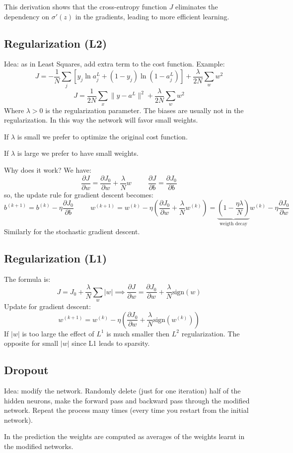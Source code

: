 This derivation shows that the cross-entropy function \( J \) eliminates the dependency on \(\sigma'(z)\) in the gradients, leading to more efficient learning.

\subsection*{Regularization (L2)}
Idea: as in Least Squares, add extra term to the cost function. Example:
\[
    J = -\dfrac{1}{N} \sum_j \left[y_j\ln a_j^L + (1-y_j)\ln(1-a_j^L)\right] + \dfrac{\lambda}{2N}\sum_w w^2    
\]
\[
    J = \dfrac{1}{2N} \sum_x \|y-a^L\|^2 + \dfrac{\lambda}{2N}\sum_w w^2    
\]
Where $\lambda > 0$ is the regularization parameter. The biases are usually not in the regularization. In this way the network will favor small weights. 

If $\lambda$ is small we prefer to optimize the original cost function.

If $\lambda$ is large we prefer to have small weights.

Why does it work? We have:
\[
    \dfrac{\partial J}{\partial w} = \dfrac{\partial J_0}{\partial w} + \dfrac{\lambda}{N} w \hspace{1cm} \dfrac{\partial J}{\partial b} = \dfrac{\partial J_0}{\partial b}    
\]
so, the update rule for gradient descent becomes:
\[
    b^{(k+1)} = b^{(k)} - \eta \dfrac{\partial J_0}{\partial b} \hspace{1cm} w^{(k+1)} = w^{(k)} - \eta \left(\dfrac{\partial J_0}{\partial w} + \dfrac{\lambda}{N} w^{(k)}\right) = \underbrace{\left(1-\dfrac{\eta \lambda}{N}\right)}_{\text{weigth decay}}w^{(k)} - \eta \dfrac{\partial J_0}{\partial w}    
\]
Similarly for the stochastic gradient descent.

\subsection*{Regularization (L1)}
The formula is:
\[
    J = J_0 + \dfrac{\lambda}{N}\sum_w |w| \implies \dfrac{\partial J}{\partial w} = \dfrac{\partial J_0}{\partial w} + \dfrac{\lambda}{N} \text{sign}(w)    
\]
Update for gradient descent:
\[
    w^{(k+1)} = w^{(k)} - \eta \left(\dfrac{\partial J_0}{\partial w} + \dfrac{\lambda}{N} \text{sign}(w^{(k)})\right)
\]
If $|w|$ is too large the effect of $L^1$ is much smaller then $L^2$ regularization. The opposite for small $|w|$ since L1 leads to sparsity.\\

\subsection*{Dropout}
Idea: modify the network. Randomly delete (just for one iteration) half of the hidden neurons, make the forward pass and backward pass through the modified network. Repeat the process many times (every time you restart from the initial network).

In the prediction the weights are computed as averages of the weights learnt in the modified networks.\\